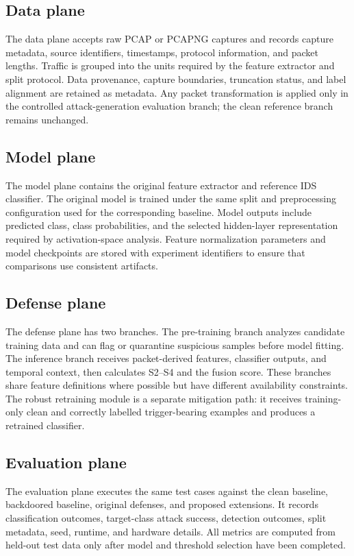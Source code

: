\documentclass[11pt]{article}
\begin{document}
\subsection{Data plane}
The data plane accepts raw PCAP or PCAPNG captures and records capture metadata, source identifiers, timestamps, protocol information, and packet lengths. Traffic is grouped into the units required by the feature extractor and split protocol. Data provenance, capture boundaries, truncation status, and label alignment are retained as metadata. Any packet transformation is applied only in the controlled attack-generation evaluation branch; the clean reference branch remains unchanged.

\subsection{Model plane}
The model plane contains the original feature extractor and reference IDS classifier. The original model is trained under the same split and preprocessing configuration used for the corresponding baseline. Model outputs include predicted class, class probabilities, and the selected hidden-layer representation required by activation-space analysis. Feature normalization parameters and model checkpoints are stored with experiment identifiers to ensure that comparisons use consistent artifacts.

\subsection{Defense plane}
The defense plane has two branches. The pre-training branch analyzes candidate training data and can flag or quarantine suspicious samples before model fitting. The inference branch receives packet-derived features, classifier outputs, and temporal context, then calculates S2--S4 and the fusion score. These branches share feature definitions where possible but have different availability constraints. The robust retraining module is a separate mitigation path: it receives training-only clean and correctly labelled trigger-bearing examples and produces a retrained classifier.

\subsection{Evaluation plane}
The evaluation plane executes the same test cases against the clean baseline, backdoored baseline, original defenses, and proposed extensions. It records classification outcomes, target-class attack success, detection outcomes, split metadata, seed, runtime, and hardware details. All metrics are computed from held-out test data only after model and threshold selection have been completed.
\end{document}
